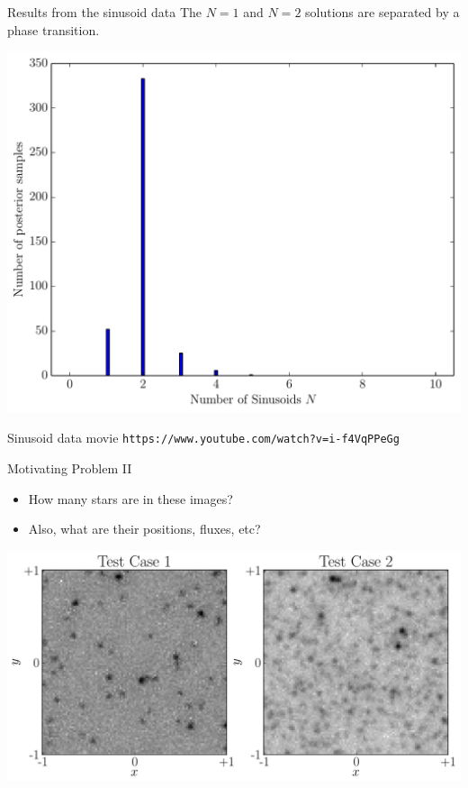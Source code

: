 \begin{frame}[t]{Results from the sinusoid data}
The $N=1$ and $N=2$ solutions are separated by a phase transition.
\begin{center}
\includegraphics[scale=0.45]{../Paper/N_result.pdf}
\end{center}
\end{frame}

\begin{frame}[t]{Sinusoid data movie}
{\tt https://www.youtube.com/watch?v=i-f4VqPPeGg}
\end{frame}

\begin{frame}[t]{Motivating Problem II}
\begin{itemize}
\item How many stars are in these images?
\item Also, what are their positions, fluxes, etc?
\end{itemize}
\begin{center}
\includegraphics[scale=0.35]{test_cases.pdf}
\end{center}
\end{frame}

